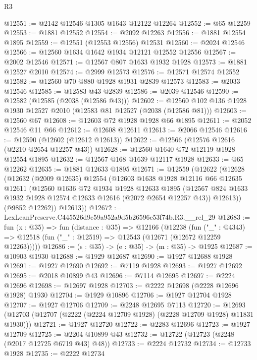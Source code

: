 \begin{lexlean}{R3}
\begin{coremodule}
@12551 := @2142 @12546 @1305 @1643 @12122 @12264
@12552 := @65 @12259
@12553 := @1881 @12552
@12554 := @2092 @12263
@12556 := @1881 @12554 @1895
@12559 := @12551 (@12553 @12556) @12531
@12560 := @2024 @12546
@12566 := @12560 @1634 @1642 @1934 @12121 @12552 @12556
@12567 := @2002 @12546
@12571 := @12567 @807 @1633 @1932 @1928
@12573 := @1881 @12527 @2010
@12574 := @2999 @12573
@12576 := @12571 @12574 @12552
@12582 := @12560 @70 @880 @1928 @1931 @2839 @12573
@12583 := @2033 @12546
@12585 := @12583 @43 @2839
@12586 := @2039 @12546
@12590 := @12582 (@12585 (@2038 (@12586 @43)))
@12602 := @12560 @102 @136 @1928 @1930 @12527 @2010 (@12583 @81 @12527 (@2038 (@12586 @81)))
@12603 := @12560 @67
@12608 := @12603 @72 @1928 @1928 @66 @1895
@12611 := @2052 @12546 @11 @66
@12612 := @12608 @12611
@12613 := @2066 @12546
@12616 := @12590 (@12602 (@12612 @12613))
@12622 := @12566 (@12576 @12616 (@2210 @2654 @12257 @43))
@12628 := @12560 @1640 @72 @12119 @1928 @12554 @1895
@12632 := @12567 @168 @1639 @12117 @1928
@12633 := @65 @12262
@12635 := @1881 @12633 @1895
@12671 := @12559
    (@12622
      (@12628
        (@12632
          (@2009 @12635)
          @12554
          (@12603
            @1638
            @1928
            @12116
            @66
            @12635
            @12611
            (@12560
              @1636
              @72
              @1934
              @1928
              @12633
              @1895
              (@12567 @824 @1633 @1932 @1928 @12574 @12633 @12616 (@2072 @2654 @12257 @43))
              @12613))
          (@9852 @12262))
        @12613))
@12672 := LexLeanPreserve.C445526d9c59a952a9d5b26596e53f74b.R3.__rel_29
@12683 := fun (x : @35) =>
  fun (distance : @35) =>
  @12166
    (@12238
      (fun ("_" : @4343) => @12518 (fun ("_" : @12519) => @12543 (@12671 (@12672 @12259 @12263)))))
@12686 := (s : @35) -> (e : @35) -> (m : @35) -> @1925
@12687 := @10903 @1930
@12688 := @1929 @12687
@12690 := @1927 @12688 @1928
@12691 := @1927 @12690
@12692 := @7119 @1928
@12693 := @1927 @12692
@12695 := @2018 @10899 @43
@12696 := @7114 @12695
@12697 := @2224 @12696
@12698 := @12697 @1928
@12703 := @2222 @12698 (@2228 @12696 @1928) @1930
@12704 := @1929 @10896
@12706 := @1927 @12704 @1928
@12707 := @1927 @12706
@12709 := @2248 @12695 @7113
@12720 := @12693 (@12703 (@12707 (@2222 (@2224 @12709 @1928) (@2228 @12709 @1928) @11831 @1930)))
@12721 := @1927 @12720
@12722 := @2283 @12696
@12723 := @1927 @12709
@12725 := @2204 @10899 @43
@12732 := @12722 (@12723 (@2248 (@2017 @12725 @6719 @43) @48))
@12733 := @2224 @12732
@12734 := @12733 @1928
@12735 := @2222 @12734

\end{coremodule}
\end{lexlean}
